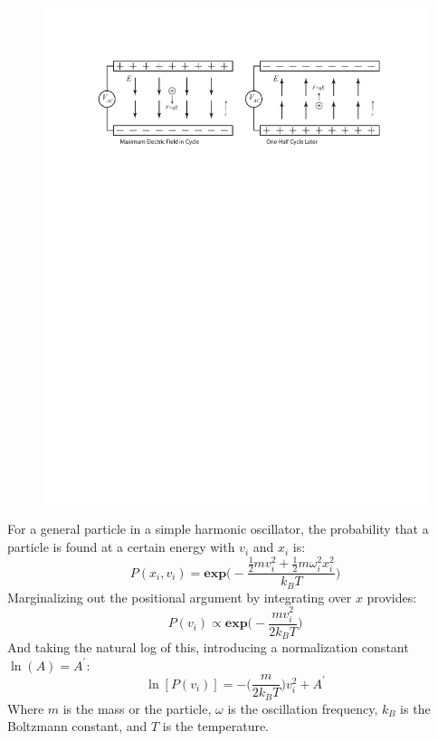 \documentclass[12pt]{article}
\begin{document}
\begin{figure}[ht]
\centering
    \includegraphics[width=\textwidth]{paul_trap_diagram.pdf}
	\caption{}
    \label{fig:paul_trap_diagram}
\end{figure}

For a general particle in a simple harmonic oscillator, the probability that a particle is found at a certain energy with $v_i$ and $x_i$ is:
\begin{equation*}
P(x_i, v_i) = \textbf{exp}\Big(-\frac{\frac{1}{2}mv_i^2 + \frac{1}{2}m\omega_i^2x_i^2}{k_B T}\Big)
\label{eq:gen_prob}
\end{equation*}
Marginalizing out the positional argument by integrating over $x$ provides:
\begin{equation*}
P(v_i) \propto \textbf{exp} \Big( -\frac{mv_i^2}{2 k_B T}\Big)
\label{eq:marg_prob}
\end{equation*}
And taking the natural log of this, introducing a normalization constant $\ln(A) = A^\prime$:
\begin{equation}
\ln[P(v_i)] = -\Big(\frac{m}{2k_B T}\Big) v_i^2 + A^\prime
\label{eq:marg_prob2}
\end{equation}
Where $m$ is the mass or the particle, $\omega$ is the oscillation frequency, $k_B$ is the Boltzmann constant, and $T$ is the temperature. 
\end{document}
